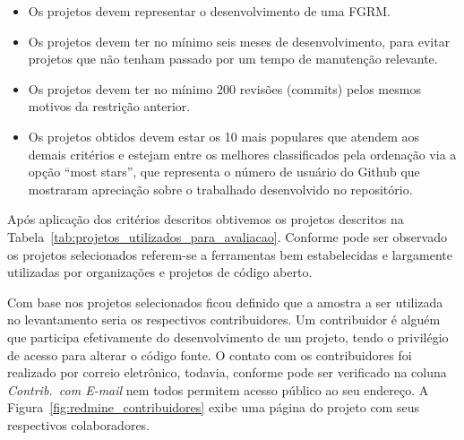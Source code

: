 \begin{itemize}
	\item Os projetos devem representar o desenvolvimento de uma FGRM\@.
	\item Os projetos devem ter no mínimo seis meses de desenvolvimento, para
		evitar projetos que não tenham passado por um tempo de manutenção
		relevante.
	\item Os projetos devem  ter  no  mínimo  200  revisões (commits)  pelos
		mesmos motivos  da restrição anterior.
    \item Os projetos obtidos devem estar os 10 mais populares que atendem aos
        demais critérios e estejam entre os melhores classificados pela
        ordenação via a opção ``most stars'', que representa o número de usuário
        do Github que mostraram apreciação sobre o trabalhado desenvolvido no
        repositório.
\end{itemize}

Após aplicação dos critérios descritos obtivemos os projetos descritos na
Tabela~\ref{tab:projetos_utilizados_para_avaliacao}. Conforme pode ser observado
os projetos selecionados referem-se a ferramentas bem estabelecidas e largamente
utilizadas por organizações e projetos de código aberto.

\begin{table}[htpb]
\centering
{}
\caption{Projetos utilizados no levantamento com profissionais. Os dados
	apresentados tem como referência 07/03/2017.}
\label{tab:projetos_utilizados_para_avaliacao}
\end{table}

Com base nos projetos selecionados ficou definido que a amostra a ser utilizada
no levantamento seria os respectivos contribuidores. Um contribuidor é alguém
que participa efetivamente do desenvolvimento de um projeto, tendo o privilégio
de acesso para alterar o código fonte. O contato com os contribuidores foi
realizado por correio eletrônico, todavia, conforme pode ser verificado na
coluna \textit{Contrib.\ com E-mail} nem todos permitem acesso público ao seu
endereço. A Figura~\ref{fig:redmine_contribuidores} exibe uma página do projeto
com seus respectivos colaboradores.

